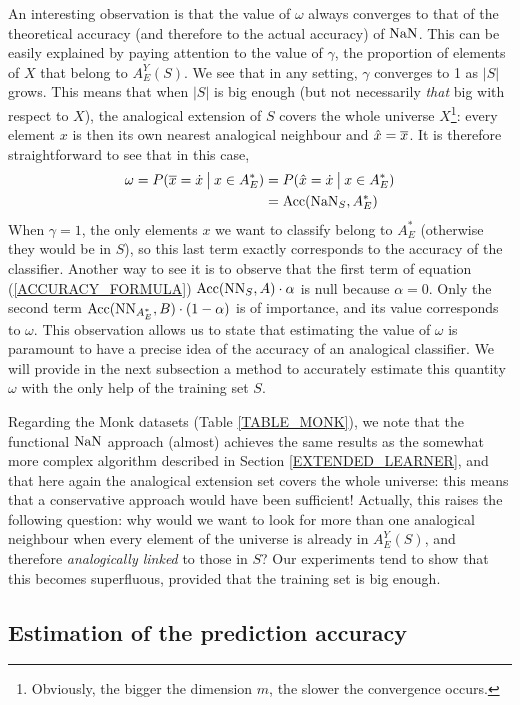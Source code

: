 An interesting observation is that the value of $\omega$ always converges to
that of the theoretical accuracy (and therefore to the actual accuracy) of
$\NaN$. This can be easily explained by paying attention to the value of
$\gamma$, the proportion of elements of $X$ that belong to $A_E^Y(S)$. We see
that in any setting, $\gamma$ converges to 1 as $|S|$ grows. This means that
when $|S|$ is big enough (but not necessarily \textit{that} big with respect to $X$), the
analogical extension of $S$ covers the whole universe $X$\footnote{Obviously,
the bigger the dimension $m$, the slower the convergence occurs.}: every
element $x$ is then its own nearest analogical neighbour and $\hat{x} =
\albl{x}$. It is therefore straightforward to see that in this case,
\begin{align*}
  \omega = P(\albl{x} = \dot{x} \given[\big] x \in A_E^*) &= P(\hat{x}
  = \dot{x} \given[\big] x \in A_E^*)\\
&= \acc(\NaN_S, A_E^*)
\end{align*}
When $\gamma = 1$, the only elements $x$ we want to classify belong to $A_E^*$
(otherwise they would be in $S$), so this last term exactly corresponds to the
accuracy of the classifier. Another way to see it is to observe that the first
term of equation (\ref{ACCURACY_FORMULA}) $\acc(\NN_{S}, A) \cdot \alpha$ is null
because $\alpha = 0$. Only the second term $\acc(\NN_{A_E^*}, B) \cdot (1 -
\alpha)$ is of importance, and its value corresponds to $\omega$. This
observation allows us to state that estimating the value of $\omega$ is
paramount to have a precise idea of the accuracy of an analogical classifier.
We will provide in the next subsection a method to accurately estimate this
quantity $\omega$ with the only help of the training set $S$.

Regarding the Monk datasets (Table \ref{TABLE_MONK}), we note that the
functional $\NaN$ approach (almost) achieves the same results as the somewhat
more complex algorithm described in Section \ref{EXTENDED_LEARNER}, and that
here again the analogical extension set covers the whole universe: this means
that a conservative approach would have been sufficient! Actually, this raises
the following question: why would we want to look for more than one analogical
neighbour when every element of the universe is already in $A_E^Y(S)$, and
therefore \textit{analogically linked} to those in $S$? Our experiments tend to
show that this becomes superfluous, provided that the training set is big
enough.

\subsection{Estimation of the prediction accuracy}

